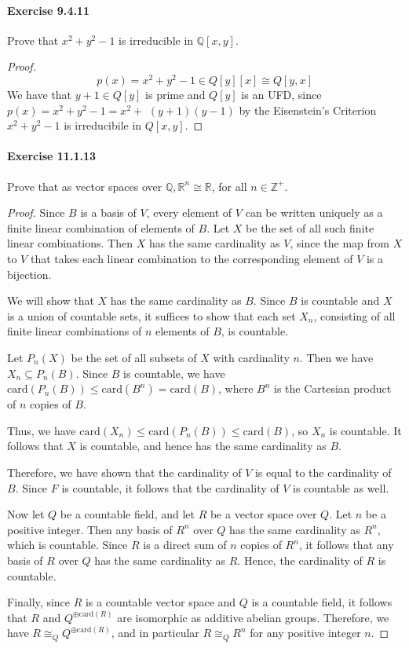 \documentclass{article}
\theoremstyle{definition}
\begin{document}
\paragraph{Exercise 9.4.11} Prove that $x^2+y^2-1$ is irreducible in $\mathbb{Q}[x,y]$.
\begin{proof}
$$
p(x)=x^2+y^2-1 \in Q[y][x] \cong Q[y, x]
$$
We have that $y+1 \in Q[y]$ is prime and $Q[y]$ is an UFD, since $p(x)=x^2+y^2-1=x^2+$ $(y+1)(y-1)$ by the Eisenstein's Criterion $x^2+y^2-1$ is irreducibile in $Q[x, y]$.
\end{proof}



\paragraph{Exercise 11.1.13} Prove that as vector spaces over $\mathbb{Q}, \mathbb{R}^n \cong \mathbb{R}$, for all $n \in \mathbb{Z}^{+}$.
\begin{proof}    
Since $B$ is a basis of $V$, every element of $V$ can be written uniquely as a finite linear combination of elements of $B$. Let $X$ be the set of all such finite linear combinations. Then $X$ has the same cardinality as $V$, since the map from $X$ to $V$ that takes each linear combination to the corresponding element of $V$ is a bijection.

We will show that $X$ has the same cardinality as $B$. Since $B$ is countable and $X$ is a union of countable sets, it suffices to show that each set $X_n$, consisting of all finite linear combinations of $n$ elements of $B$, is countable.

Let $P_n(X)$ be the set of all subsets of $X$ with cardinality $n$. Then we have $X_n \subseteq P_n(B)$. Since $B$ is countable, we have $\mathrm{card}(P_n(B)) \leq \mathrm{card}(B^n) = \mathrm{card}(B)$, where $B^n$ is the Cartesian product of $n$ copies of $B$.

Thus, we have $\mathrm{card}(X_n) \leq \mathrm{card}(P_n(B)) \leq \mathrm{card}(B)$, so $X_n$ is countable. It follows that $X$ is countable, and hence has the same cardinality as $B$.

Therefore, we have shown that the cardinality of $V$ is equal to the cardinality of $B$. Since $F$ is countable, it follows that the cardinality of $V$ is countable as well.

Now let $Q$ be a countable field, and let $R$ be a vector space over $Q$. Let $n$ be a positive integer. Then any basis of $R^n$ over $Q$ has the same cardinality as $R^n$, which is countable. Since $R$ is a direct sum of $n$ copies of $R^n$, it follows that any basis of $R$ over $Q$ has the same cardinality as $R$. Hence, the cardinality of $R$ is countable.

Finally, since $R$ is a countable vector space and $Q$ is a countable field, it follows that $R$ and $Q^{\oplus \mathrm{card}(R)}$ are isomorphic as additive abelian groups. Therefore, we have $R \cong_Q Q^{\oplus \mathrm{card}(R)}$, and in particular $R \cong_Q R^n$ for any positive integer $n$.
\end{proof}
\end{document}
